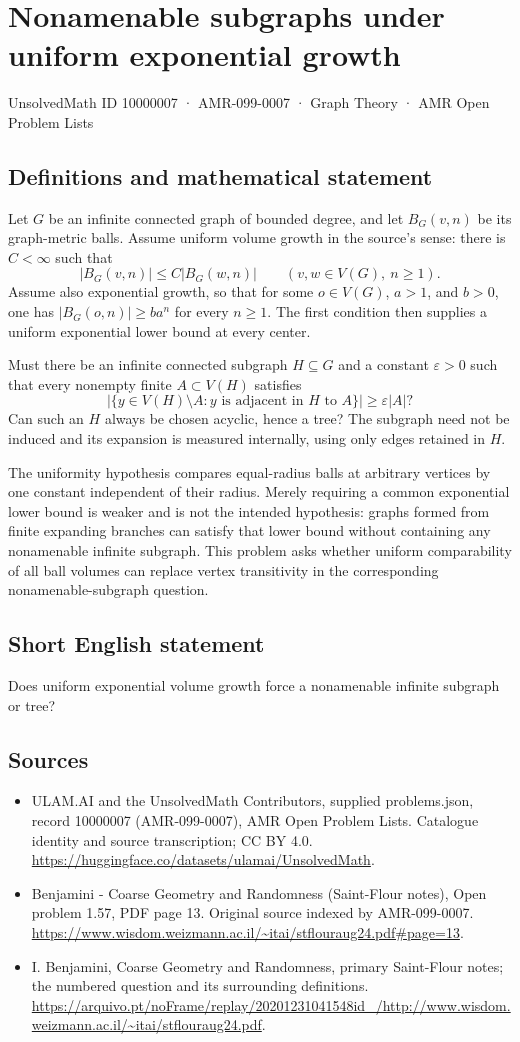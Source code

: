 \documentclass[11pt,a4paper]{article}
\begin{document}
\section*{Nonamenable subgraphs under uniform exponential growth}\label{10000007}
{\small UnsolvedMath ID 10000007 · AMR-099-0007 · Graph Theory · AMR Open Problem Lists}
\subsection{Definitions and mathematical statement}
Let $G$ be an infinite connected graph of bounded degree, and let $B_G(v,n)$ be its graph-metric balls. Assume uniform volume growth in the source's sense: there is $C<\infty$ such that
\[
|B_G(v,n)|\le C|B_G(w,n)|\qquad(v,w\in V(G),\ n\ge1).
\]
Assume also exponential growth, so that for some $o\in V(G)$, $a>1$, and $b>0$, one has $|B_G(o,n)|\ge ba^n$ for every $n\ge1$. The first condition then supplies a uniform exponential lower bound at every center.

Must there be an infinite connected subgraph $H\subseteq G$ and a constant $\varepsilon>0$ such that every nonempty finite $A\subset V(H)$ satisfies
\[
|\{y\in V(H)\setminus A:y\text{ is adjacent in }H\text{ to }A\}|
\ge\varepsilon |A|?
\]
Can such an $H$ always be chosen acyclic, hence a tree? The subgraph need not be induced and its expansion is measured internally, using only edges retained in $H$.

The uniformity hypothesis compares equal-radius balls at arbitrary vertices by one constant independent of their radius. Merely requiring a common exponential lower bound is weaker and is not the intended hypothesis: graphs formed from finite expanding branches can satisfy that lower bound without containing any nonamenable infinite subgraph. This problem asks whether uniform comparability of all ball volumes can replace vertex transitivity in the corresponding nonamenable-subgraph question.
\subsection{Short English statement}
Does uniform exponential volume growth force a nonamenable infinite subgraph or tree?
\subsection{Sources}
\begin{itemize}
\item[S1] ULAM.AI and the UnsolvedMath Contributors, supplied problems.json, record 10000007 (AMR-099-0007), AMR Open Problem Lists. Catalogue identity and source transcription; CC BY 4.0.
\url{https://huggingface.co/datasets/ulamai/UnsolvedMath}.
\item[S2] Benjamini - Coarse Geometry and Randomness (Saint-Flour notes), Open problem 1.57, PDF page 13. Original source indexed by AMR-099-0007.
\url{https://www.wisdom.weizmann.ac.il/~itai/stflouraug24.pdf#page=13}.
\item[S3] I. Benjamini, Coarse Geometry and Randomness, primary Saint-Flour notes; the numbered question and its surrounding definitions.
\url{https://arquivo.pt/noFrame/replay/20201231041548id_/http://www.wisdom.weizmann.ac.il/~itai/stflouraug24.pdf}.
\end{itemize}
\end{document}
